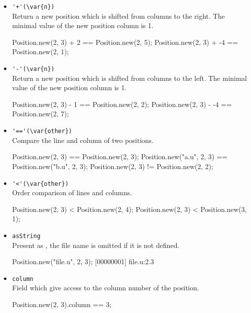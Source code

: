 \begin{itemize}
\item \lstinline|'+'(\var{n})|\\
  Return a new position which is shifted from  columns to the right.  The minimal
  value of the new position column is 1.
\begin{urbiassert}[firstnumber=last]
Position.new(2, 3) + 2 == Position.new(2, 5);
Position.new(2, 3) + -4 == Position.new(2, 1);
\end{urbiassert}

\item \lstinline|'-'(\var{n})|\\
  Return a new position which is shifted from  columns to the left.  The minimal
  value of the new position column is 1.
\begin{urbiassert}[firstnumber=last]
Position.new(2, 3) - 1 == Position.new(2, 2);
Position.new(2, 3) - -4 == Position.new(2, 7);
\end{urbiassert}

\item \lstinline|'=='(\var{other})|\\
  Compare the line and column of two positions.
\begin{urbiassert}[firstnumber=last]
Position.new(2, 3) == Position.new(2, 3);
Position.new("a.u", 2, 3) == Position.new("b.u", 2, 3);
Position.new(2, 3) != Position.new(2, 2);
\end{urbiassert}

\item \lstinline|'<'(\var{other})|\\
  Order comparison of lines and columns.
\begin{urbiassert}[firstnumber=last]
Position.new(2, 3) < Position.new(2, 4);
Position.new(2, 3) < Position.new(3, 1);
\end{urbiassert}

\item \lstinline|asString|\\
  Present as , the file name is
  omitted if it is not defined.
\begin{urbiscript}
Position.new("file.u", 2, 3);
[00000001] file.u:2.3
\end{urbiscript}

\item \lstinline|column|\\
  Field which give access to the column number of the position.
\begin{urbiassert}[firstnumber=last]
Position.new(2, 3).column == 3;
\end{urbiassert}


\end{itemize}

